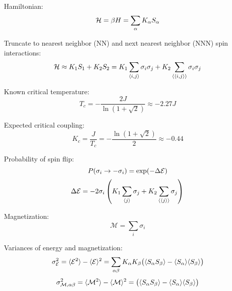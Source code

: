 \documentclass[12pt]{article}
\begin{document}
Hamiltonian:
\begin{equation}
\mathcal{H} = \beta H = \sum_{\alpha} K_\alpha S_\alpha \\
\end{equation}


Truncate to nearest neighbor (NN) and next nearest neighbor (NNN) spin interactions:
\begin{equation}
\mathcal{H} \approx K_1 S_1 + K_2 S_2 
= K_1 \sum_{\langle i, j \rangle} \sigma_i \sigma_j + K_2 \sum_{\langle \langle i, j \rangle \rangle} \sigma_i \sigma_j \\
\end{equation}

Known critical temperature: 
\begin{equation}
T_c = - \frac{2 J}{\ln (1+\sqrt{2})} \approx - 2.27 J
\end{equation}

Expected critical coupling:
\begin{equation}
K_c = \frac{J}{T_c} = -\frac{\ln (1+\sqrt{2})}{2} \approx -0.44
\end{equation}

Probability of spin flip:
\begin{equation}
P(\sigma_i \rightarrow -\sigma_i) = \exp(-\Delta \mathcal{E})\\
\end{equation}
\begin{equation}
\Delta \mathcal{E} 
= -2 \sigma_i  \left( K_1 \sum_{\langle j \rangle} \sigma_j 
+ K_2\sum_{\langle \langle j \rangle \rangle} \sigma_j \right)\\
\end{equation}

Magnetization:
\begin{equation}
\mathcal{M} 
= \sum_i \sigma_i
\end{equation}

Variances of energy and magnetization:
\begin{equation}
\sigma_\mathcal{E} ^2
=\langle  \mathcal{E} ^2 \rangle 
- \langle  \mathcal{E}  \rangle ^2
= \sum_{\alpha \beta} K_\alpha K_\beta \big( \langle S_\alpha S_\beta \rangle
- \langle S_\alpha  \rangle 
\langle  S_\beta \rangle \big)\\
\end{equation}
\begin{equation}
\sigma_{\mathcal{M}, \alpha \beta} ^2
=\langle  \mathcal{M} ^2 \rangle 
- \langle  \mathcal{M}  \rangle ^2
=  \big( \langle S_\alpha S_\beta \rangle
- \langle S_\alpha  \rangle 
\langle  S_\beta \rangle \big)\\
\end{equation}
\end{document}
